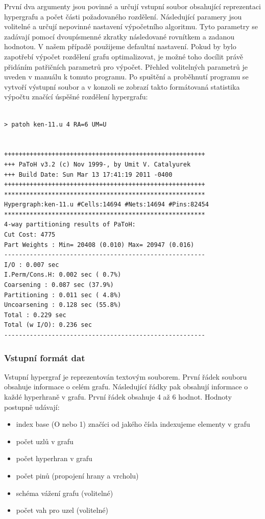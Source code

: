 \documentclass[thesis=M,czech]{FITthesis}[2012/06/26]
\begin{document}
První dva argumenty jsou povinné a určují vstupní soubor obsahující reprezentaci hypergrafu a počet části požadovaného rozdělení. Následující paramery jsou volitelné a určují nepovinné nastavení výpočetního algoritmu.  Tyto parametry se zadávají pomocí dvoupísmenné zkratky následované rovnítkem a zadanou hodnotou. V našem případě použijeme defaultní nastavení. Pokud by bylo zapotřebí výpočet rozdělení grafu optimalizovat, je možné toho docílit právě přidáním patřičních parametrů pro výpočet. Přehled volitelných parametrů je uveden v manuálu k tomuto programu. Po spuštění a proběhnutí programu se vytvoří výstupní soubor a v konzoli se zobrazí takto formátovaná statistika výpočtu značící úspěšné rozdělení hypergrafu:
\medskip
\begin{lstlisting}[frame=single]  % Start your code-block
 
> patoh ken-11.u 4 RA=6 UM=U 
 
 
+++++++++++++++++++++++++++++++++++++++++++++++++++++++
+++ PaToH v3.2 (c) Nov 1999-, by Umit V. Catalyurek
+++ Build Date: Sun Mar 13 17:41:19 2011 -0400
+++++++++++++++++++++++++++++++++++++++++++++++++++++++
*******************************************************
Hypergraph:ken-11.u #Cells:14694 #Nets:14694 #Pins:82454
*******************************************************
4-way partitioning results of PaToH:
Cut Cost: 4775
Part Weights : Min= 20408 (0.010) Max= 20947 (0.016)
-------------------------------------------------------
I/O : 0.007 sec
I.Perm/Cons.H: 0.002 sec ( 0.7%)
Coarsening : 0.087 sec (37.9%)
Partitioning : 0.011 sec ( 4.8%)
Uncoarsening : 0.128 sec (55.8%)
Total : 0.229 sec
Total (w I/O): 0.236 sec
-------------------------------------------------------

\end{lstlisting}
\medskip
\subsubsection{Vstupní formát dat}
Vstupní hypergraf je reprezentován textovým souborem. První řádek souboru obsahuje informace o celém grafu. Následující řádky pak obsahují informace o každé hyperhraně v grafu. První řádek obsahuje 4 až 6 hodnot. Hodnoty postupně udávají:
\begin{itemize}
\item index base (O nebo 1) značíci od jakého čísla indexujeme elementy v grafu
\item počet uzlů v grafu
\item počet hyperhran v grafu
\item počet pinů (propojení hrany a vrcholu)
\item schéma vážení grafu (volitelné)
\item počet vah pro uzel (volitelné)
\end{itemize}
\end{document}
